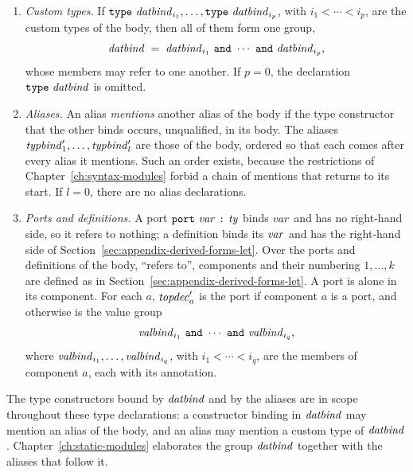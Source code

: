 \begin{enumerate}
\item \emph{Custom types.} If $\kw{type}\ \datbind_{i_1},\ldots,
  \kw{type}\ \datbind_{i_p}$, with $i_1<\cdots<i_p$, are the custom types of
  the body, then all of them form one group,
  \[
    \datbind \;=\; \datbind_{i_1}\ \kw{and}\ \cdots\ \kw{and}\ \datbind_{i_p},
  \]
  whose members may refer to one another. If $p=0$, the declaration
  $\textnormal{\texttt{type}}\ \mathit{datbind}$ is omitted.

\item \emph{Aliases.} An alias \emph{mentions} another alias of the body if
  the type constructor that the other binds occurs, unqualified, in its body.
  The aliases $\mathit{typbind}'_1,\ldots,\mathit{typbind}'_l$ are those of the body, ordered
  so that each comes after every alias it mentions. Such an order exists,
  because the restrictions of Chapter~\ref{ch:syntax-modules} forbid a chain
  of mentions that returns to its start. If $l=0$, there are no alias
  declarations.

\item \emph{Ports and definitions.} A port $\textnormal{\texttt{port}}\ \mathit{var}\ \textnormal{\texttt{:}}\ \mathit{ty}$
  binds $\mathit{var}$ and has no right-hand side, so it refers to nothing; a
  definition binds its $\mathit{var}$ and has the right-hand side of
  Section~\ref{sec:appendix-derived-forms-let}. Over the ports and
  definitions of the body, ``refers to'', components and their numbering
  $1,\ldots,k$ are defined as in Section~\ref{sec:appendix-derived-forms-let}.
  A port is alone in its component. For each $a$, $\mathit{topdec}'_a$ is the port if
  component $a$ is a port, and otherwise is the value group
  \[
    \valbind_{i_1}\ \kw{and}\ \cdots\ \kw{and}\ \valbind_{i_q},
  \]
  where $\mathit{valbind}_{i_1},\ldots,\mathit{valbind}_{i_q}$, with $i_1<\cdots<i_q$, are the
  members of component $a$, each with its annotation.
\end{enumerate}

The type constructors bound by $\mathit{datbind}$ and by the aliases are in scope
throughout these type declarations: a constructor binding in $\mathit{datbind}$ may
mention an alias of the body, and an alias may mention a custom type of
$\mathit{datbind}$. Chapter~\ref{ch:static-modules} elaborates the group $\mathit{datbind}$
together with the aliases that follow it.

